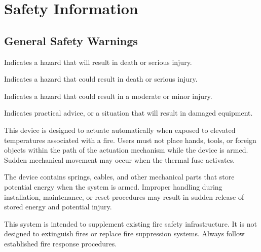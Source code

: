\documentclass[12pt, a4paper]{report}
\begin{document}
\chapter{Safety Information}

\section{General Safety Warnings}
    \begin{danger}
        Indicates a hazard that will result in death or serious injury.
    \end{danger}
    \begin{warning}
        Indicates a hazard that could result in death or serious injury.
    \end{warning}
    \begin{caution}
        Indicates a hazard that could result in a moderate or minor injury.
    \end{caution}
    \begin{notice}
        Indicates practical advice, or a situation that will result in damaged
        equipment.
    \end{notice}

\hline
   
    \begin{warning}
        This device is designed to actuate automatically when exposed to elevated temperatures associated with a fire. Users must not place hands, tools, or foreign objects within the path of the actuation mechanism while the device is armed. Sudden mechanical movement may occur when the thermal fuse activates.
    \end{warning}

    \begin{warning}
        The device contains springs, cables, and other mechanical parts that store potential energy when the system is armed. Improper handling during installation, maintenance, or reset procedures may result in sudden release of stored energy and potential injury.
    \end{warning}

    \begin{warning}
        This system is intended to supplement existing fire safety infrastructure. It is not designed to extinguish fires or replace fire suppression systems. Always follow established fire response procedures.
    \end{warning}
\end{document}
